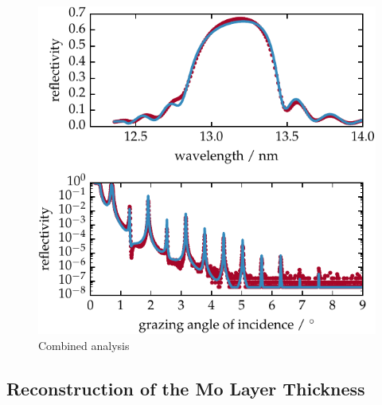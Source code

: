 \begin{figure}[htbp]
\centering
\includegraphics{img/PS5657}
\caption{Combined analysis}
\label{ch_spec:fig_EUV_XRR_combined}
\end{figure}


\subsection{Reconstruction of the Mo Layer Thickness}
